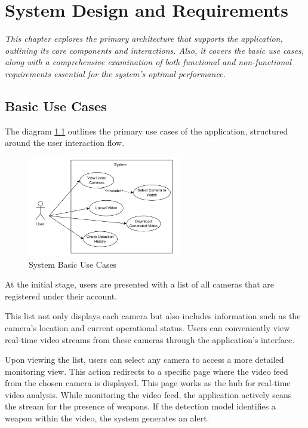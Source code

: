 \chapter{System Design and Requirements}
\label{chapter:design}

\newenvironment{design}
{\quote\itshape}
{\endquote}

\begin{design}
    This chapter explores the primary architecture that supports the application, outlining its core components and 
    interactions. Also, it covers the basic use cases, along with a comprehensive examination of both 
    functional and non-functional requirements essential for the system's optimal performance.
\end{design}

\section{Basic Use Cases}
The diagram \ref{fig:use-cases} outlines the primary use cases of the application, structured around the user 
interaction flow.

\begin{figure}[h]
    \centering 
    \includegraphics[width=0.6\textwidth]{figs/use-cases3.png} 
    \caption{System Basic Use Cases}
    \label{fig:use-cases}
\end{figure}

At the initial stage, users are presented with a list of all cameras that are registered under their account. 

This list not only displays each camera but also includes information such as the camera's location and current operational
status. Users can conveniently view real-time video streams from these cameras through the application's interface.

Upon viewing the list, users can select any camera to access a more detailed monitoring view. This action 
redirects to a specific page where the video feed from the chosen camera is displayed. This page works 
as the hub for real-time video analysis. While monitoring the video feed, the application actively scans the stream 
for the presence of weapons. If the detection model identifies a weapon within the video, the system generates an alert.


